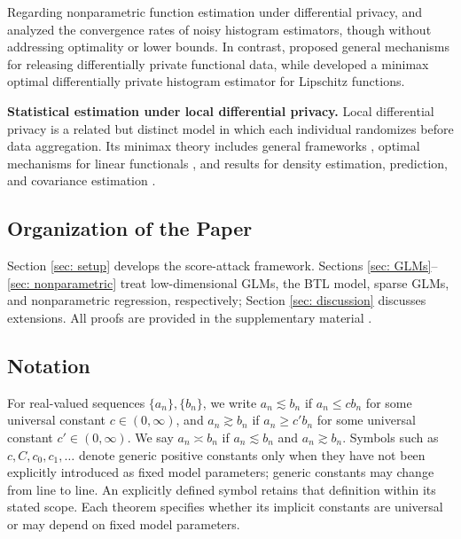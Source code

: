 \documentclass[letterpaper,12pt]{article}
\numberwithin{equation}{section}
\theoremstyle{plain}
\numberwithin{Theorem}{section}
\numberwithin{proposition}{section}
\numberwithin{Lemma}{section}
{
	\theoremstyle{definition}
	\newtheorem{Definition}{Definition}
	\newtheorem{example}{Example}
	\numberwithin{example}{section}
	\newtheorem{fact}{Fact}
	\numberwithin{fact}{section}
	\newtheorem{remark}{Remark}
}
\newcommand{\furtherrev}[1]{#1}
\newcommand{\1}{\mathbbm{1}}
\begin{document}
Regarding \furtherrev{nonparametric} function estimation under differential privacy, \cite{wasserman2010statistical} and \cite{lei2011differentially} analyzed the convergence rates of noisy histogram estimators, though without addressing optimality or lower bounds. In contrast, \cite{hall2013differential} proposed general mechanisms for releasing differentially private functional data, while \cite{barber2014privacy} developed a minimax optimal differentially private histogram estimator for Lipschitz functions.

\textbf{Statistical estimation under local differential privacy.} Local differential privacy \cite{kasiviswanathan2011can} is a related but distinct model in which each individual randomizes before data aggregation. Its minimax theory includes general frameworks \cite{duchi2013local,duchi2018minimax}, optimal mechanisms for linear functionals \cite{rohde2020geometrizing}, and results for density estimation, prediction, and covariance estimation \cite{butucea2020local,kroll2020adaptive,sart2023density,gyorfi2022rate,amorino2023minimax}.

  
\subsection{Organization of the Paper}

Section \ref{sec: setup} develops the score-attack framework. Sections \ref{sec: GLMs}--\ref{sec: nonparametric} treat low-dimensional GLMs, the BTL model, sparse GLMs, and \furtherrev{nonparametric} regression, respectively; Section \ref{sec: discussion} discusses extensions. All proofs are provided in the supplementary material \cite{supplement}.

\subsection{Notation}

 For real-valued sequences $\{a_n\}, \{b_n\}$, we write $a_n \lesssim b_n$ if $a_n \leq cb_n$ for some universal constant $c \in (0, \infty)$, and $a_n \gtrsim b_n$ if $a_n \geq c'b_n$ for some universal constant $c' \in (0, \infty)$.  We say $a_n \asymp b_n$ if $a_n \lesssim b_n$ and $a_n \gtrsim b_n$. \furtherrev{Symbols such as $c,C,c_0,c_1,\ldots$ denote generic positive constants only when they have not been explicitly introduced as fixed model parameters; generic constants may change from line to line. An explicitly defined symbol retains that definition within its stated scope. Each theorem specifies whether its implicit constants are universal or may depend on fixed model parameters.}
\end{document}
